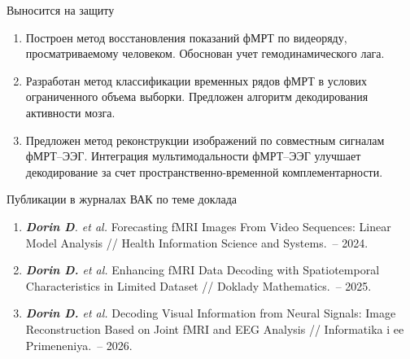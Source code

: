 \documentclass[aspectratio=43]{beamer}
\begin{document}
\begin{frame}{Выносится на защиту}
\footnotesize
\begin{enumerate}
\justifying
    \item Построен метод восстановления показаний фМРТ по видеоряду, просматриваемому человеком. Обоснован учет гемодинамического лага.
    \item Разработан метод классификации временных рядов фМРТ в услових ограниченного объема выборки. Предложен алгоритм декодирования активности мозга.
    \item Предложен метод реконструкции изображений по совместным сигналам фМРТ--ЭЭГ. Интеграция мультимодальности фМРТ--ЭЭГ улучшает декодирование за счет пространственно-временной комплементарности.
\end{enumerate}
\footnotesize
\begin{block}{\small Публикации в журналах ВАК по теме доклада}
\begin{enumerate}
\justifying
    \item \textit{\textbf{Dorin D}. et al.} Forecasting fMRI Images From Video Sequences: Linear Model Analysis // Health Information Science and Systems.~-- 2024.
    \item \textit{\textbf{Dorin D.} et al.} Enhancing fMRI Data Decoding with Spatiotemporal Characteristics in Limited Dataset // Doklady Mathematics.~-- 2025.
    \item \textit{\textbf{Dorin D.} et al.} Decoding Visual Information from Neural Signals: Image Reconstruction Based on Joint fMRI and EEG Analysis // Informatika i ee Primeneniya.~-- 2026.
\end{enumerate}
\end{block}
\end{frame}
\end{document}
